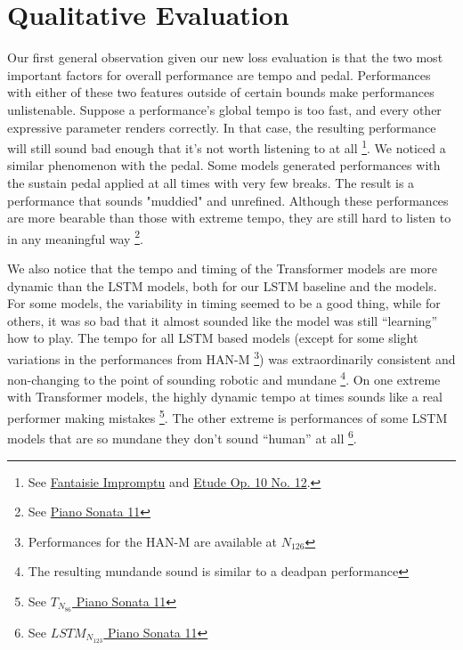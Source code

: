 

\section{Qualitative Evaluation}\label{sec:qualitative-analysis}
Our first general observation given our new loss evaluation is that the two most important factors for overall performance are tempo and pedal. Performances with either of these two features outside of certain bounds make performances unlistenable. Suppose a performance's global tempo is too fast, and every other expressive parameter renders correctly. In that case, the resulting performance will still sound bad enough that it's not worth listening to at all \footnote{See \href{https://ui.neptune.ai/richt3211/thesis/e/THESIS-86/artifacts}{ Fantaisie Impromptu} and \href{https://ui.neptune.ai/richt3211/thesis/e/THESIS-126/artifacts}{ Etude Op. 10 No. 12}.}. We noticed a similar phenomenon with the pedal. Some models generated performances with the sustain pedal applied at all times with very few breaks. The result is a performance that sounds "muddied" and unrefined. Although these performances are more bearable than those with extreme tempo, they are still hard to listen to in any meaningful way \footnote{See \href{https://ui.neptune.ai/richt3211/thesis/e/THESIS-125/artifacts}{ Piano Sonata 11} }. 

\newcommand{\lm}[1]{$LSTM_{N_{#1}}$}

We also notice that the tempo and timing of the Transformer models are more dynamic than the LSTM models, both for our LSTM baseline and the \vnet{} models. For some models, the variability in timing seemed to be a good thing, while for others, it was so bad that it almost sounded like the model was still ``learning'' how to play. The tempo for all LSTM based models (except for some slight variations in the performances from HAN-M \footnote{Performances for the HAN-M are available at \href{https://ui.neptune.ai/richt3211/thesis/e/THESIS-162/artifacts}{$N_{126}$}}) was extraordinarily consistent and non-changing to the point of sounding robotic and mundane%
\footnote{The resulting mundande sound is similar to a deadpan performance}. On one extreme with Transformer models, the highly dynamic tempo at times sounds like a real performer making mistakes \footnote{See \href{https://ui.neptune.ai/richt3211/thesis/e/THESIS-86/artifacts}{$T_{N_{86}}$ Piano Sonata 11}}. The other extreme is performances of some LSTM models that are so mundane they don't sound ``human'' at all \footnote{See \href{https://ui.neptune.ai/richt3211/thesis/e/THESIS-123/artifacts}{\lm{123} Piano Sonata 11}}. 

